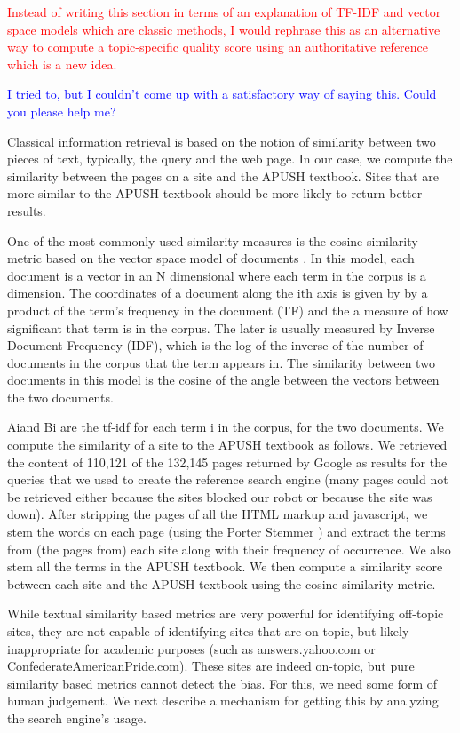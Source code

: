 \documentclass[pdfpagelabels=false,plainpages=true]{acm_proc_article-sp}
\begin{document}
\textcolor{red}{Instead of writing this section in terms of an explanation of
  TF-IDF and vector space models which are classic methods, I would rephrase this
  as an alternative way to compute a topic-specific quality score using an
  authoritative reference which is a new idea.}

\textcolor{blue}{I tried to, but I couldn't come up with a satisfactory way of
  saying this. Could you please help me?} 

Classical information retrieval is based on the notion of similarity between two
pieces of text, typically, the query and the web page.  In our case, we compute
the similarity between the pages on a site and the APUSH textbook. Sites that
are more similar to the APUSH textbook should  be more likely to return better
results. 

One of the most commonly used similarity measures is the cosine similarity
metric based on the vector space model of documents \cite{salton1975vector}. In
this model, each document is a vector in an N dimensional where each term in the
corpus is a dimension. The coordinates of a document along the ith axis is given by by a
product of the term's frequency in the document (TF) and the a measure of how
significant that term is in the corpus. The later is usually measured by Inverse
Document Frequency (IDF), which is the log of the inverse of the number of
documents in the corpus that the term appears in. The similarity between two
documents in this model is the cosine of the angle between the vectors between
the two documents. 

Aiand Bi are the tf-idf for each term i in the corpus, for the two documents. We
compute the similarity of a site to the APUSH textbook as follows. We retrieved
the content of 110,121 of the 132,145 pages returned by Google as results for
the queries that we used to create the reference search engine (many pages could
not be retrieved either because the sites blocked our robot or because the site
was down). After stripping the pages of all the HTML markup and javascript, we
stem the words on each page (using the Porter Stemmer
\cite{porter1980algorithm}) and extract the terms from (the pages from) each
site along with their frequency of occurrence. We also stem all the terms in the
APUSH textbook. We then compute a similarity score between each site and the
APUSH textbook using the cosine similarity metric.

While textual similarity based metrics are very powerful for identifying
off-topic sites, they are not capable of identifying sites that are on-topic,
but likely inappropriate for academic purposes (such as answers.yahoo.com or
ConfederateAmericanPride.com). These sites are indeed on-topic, but pure
similarity based metrics cannot detect the bias. For this, we need some form of
human judgement. We next describe a mechanism for getting this by analyzing the
search engine's usage. 
\end{document}

